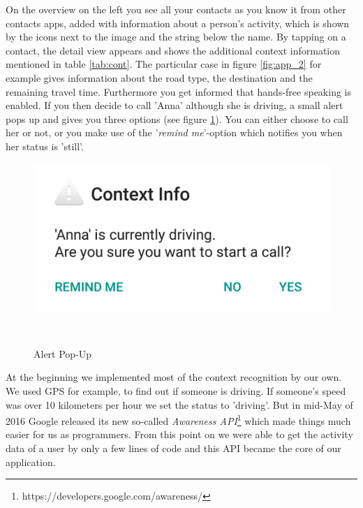 \documentclass{sigchi}
\begin{document}
On the overview on the left you see all your contacts as you know it from other contacts apps, added with information about a person's activity, which is shown by the icons next to the image and the string below the name. By tapping on a contact, the detail view appears and shows the additional context information mentioned in table \ref{tab:cont}. The particular case in figure \ref{fig:app_2} for example gives information about the road type, the destination and the remaining travel time. Furthermore you get informed that hands-free speaking is enabled. If you then decide to call 'Anna' although she is driving, a small alert pops up and gives you three options (see figure \ref{fig:app_3}). You can either choose to call her or not, or you make use of the '\textit{remind me}'-option which notifies you when her status is 'still'.
\begin{figure}[H]
  \centering
  \includegraphics[width=.55\columnwidth]{figures/app_3}
  \caption{Alert Pop-Up}~\label{fig:app_3}
\end{figure}
At the beginning we implemented most of the context recognition by our own. We used GPS for example, to find out if someone is driving. If someone's speed was over 10 kilometers per hour we set the status to 'driving'. But in mid-May of 2016 Google released its new so-called \textit{Awareness API}\footnote{https://developers.google.com/awareness/} which made things much easier for us as programmers. From this point on we were able to get the activity data of a user by only a few lines of code and this API became the core of our application.
\end{document}
